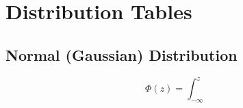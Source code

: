 \chapter{Distribution Tables}

\section{Normal (Gaussian) Distribution}

\[
\Phi(z)=\int_{-\infty}^{z}
\]
\begin{longtable}{|c||r|r|r|r|r|r|r|r|r|r|}

\end{longtable}
